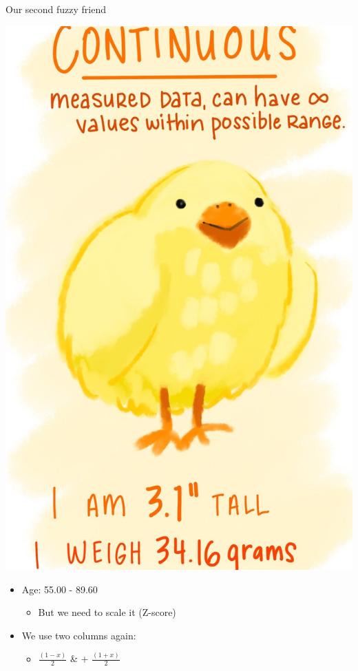 \documentclass[
  ignorenonframetext,
]{beamer}
\providecommand{\tightlist}{%
  \setlength{\itemsep}{0pt}\setlength{\parskip}{0pt}}
\begin{document}
\begin{frame}{Our second fuzzy friend}
\protect\hypertarget{our-second-fuzzy-friend}{}

\begin{center}
\includegraphics{../images/cont_copy.jpg}
\end{center}

\end{frame}

\begin{frame}

\begin{itemize}[<+->]
\tightlist
\item
  Age: 55.00 - 89.60

  \begin{itemize}[<+->]
  \tightlist
  \item
    But we need to scale it (Z-score)
  \end{itemize}
\item
  We use two columns again:

  \begin{itemize}[<+->]
  \tightlist
  \item
    \(\frac{(1 - x)}{2}\) \& + \(\frac{(1 + x)}{2}\)
  \end{itemize}
\end{itemize}

\end{frame}
\end{document}
